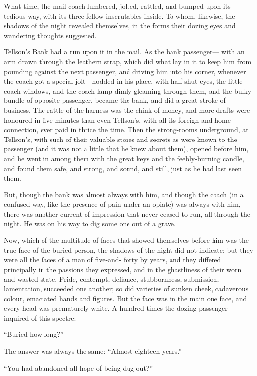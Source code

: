 What time, the mail-coach lumbered, jolted, rattled, and bumped upon
its tedious way, with its three fellow-inscrutables inside.  To whom,
likewise, the shadows of the night revealed themselves, in the forms
their dozing eyes and wandering thoughts suggested.

Tellson's Bank had a run upon it in the mail.  As the bank passenger---%
with an arm drawn through the leathern strap, which did what lay in
it to keep him from pounding against the next passenger, and driving
him into his corner, whenever the coach got a special jolt---nodded in
his place, with half-shut eyes, the little coach-windows, and the
coach-lamp dimly gleaming through them, and the bulky bundle of
opposite passenger, became the bank, and did a great stroke of business.
The rattle of the harness was the chink of money, and more drafts
were honoured in five minutes than even Tellson's, with all its
foreign and home connection, ever paid in thrice the time.  Then the
strong-rooms underground, at Tellson's, with such of their valuable
stores and secrets as were known to the passenger (and it was not a
little that he knew about them), opened before him, and he went in
among them with the great keys and the feebly-burning candle, and
found them safe, and strong, and sound, and still, just as he had
last seen them.

But, though the bank was almost always with him, and though the coach
(in a confused way, like the presence of pain under an opiate) was
always with him, there was another current of impression that never
ceased to run, all through the night.  He was on his way to dig some
one out of a grave.

Now, which of the multitude of faces that showed themselves before
him was the true face of the buried person, the shadows of the night
did not indicate; but they were all the faces of a man of five-and-%
forty by years, and they differed principally in the passions they
expressed, and in the ghastliness of their worn and wasted state.
Pride, contempt, defiance, stubbornness, submission, lamentation,
succeeded one another; so did varieties of sunken cheek, cadaverous
colour, emaciated hands and figures.  But the face was in the main
one face, and every head was prematurely white.  A hundred times the
dozing passenger inquired of this spectre:

``Buried how long?''

The answer was always the same:  ``Almost eighteen years.''

``You had abandoned all hope of being dug out?''

